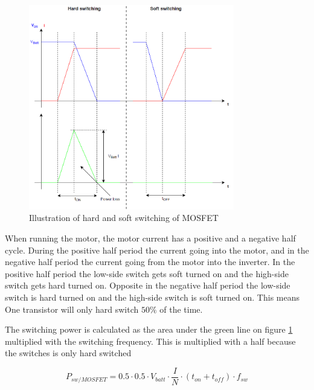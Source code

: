     \begin{figure}[H]
		\centering
		\includegraphics[width=0.8\textwidth]{pictures/hardware/Power_Board/Hard_soft_switching.PNG}
		\caption{Illustration of hard and soft switching of MOSFET}
		\label{fig:HardSoftSwitch}
	\end{figure} 

When running the motor, the motor current has a positive and a negative half cycle. During the positive half period the current going into the motor, and in the negative half period the current going from the motor into the inverter. In the positive half period the low-side switch gets soft turned on and the high-side switch gets hard turned on. Opposite in the negative half period the low-side switch is hard turned on and the high-side switch is soft turned on. This means One transistor will only hard switch $50 \%$ of the time.

The switching power is calculated as the area under the green line on figure \ref{fig:HardSoftSwitch} multiplied with the switching frequency. This is multiplied with a half because the switches is only hard switched $$ 

    \begin{equation}
        P_{sw/MOSFET} = 0.5 \cdot 0.5 \cdot V_{batt} \cdot \frac{I}{N} \cdot (t_{on}+t_{off}) \cdot f_{sw}
    \end{equation}



